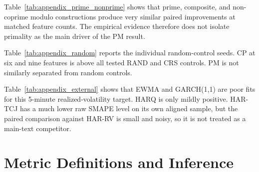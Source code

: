 \documentclass[a4paper]{article}
\begin{document}
\clearpage

{\renewcommand{\thetable}{C3}
\begin{center}
\label{tab:appendix_prime_nonprime}
\scriptsize
\renewcommand{\arraystretch}{1.08}
\resizebox{0.84\textwidth}{!}{}
\end{center}}

\noindent
Table~\ref{tab:appendix_prime_nonprime} shows that prime, composite, and non-coprime modulo constructions produce very similar paired improvements at matched feature counts. The empirical evidence therefore does not isolate primality as the main driver of the PM result.

\clearpage

{\renewcommand{\thetable}{C4}
\begin{center}
\label{tab:appendix_random}
\scriptsize
\renewcommand{\arraystretch}{1.08}
\resizebox{0.88\textwidth}{!}{}
\end{center}}

\noindent
Table~\ref{tab:appendix_random} reports the individual random-control seeds. CP at six and nine features is above all tested RAND and CRS controls. PM is not similarly separated from random controls.

{\renewcommand{\thetable}{C5}
\begin{center}
\label{tab:appendix_external}
\scriptsize
\renewcommand{\arraystretch}{1.08}
\resizebox{0.62\textwidth}{!}{}
\end{center}}

\noindent
Table~\ref{tab:appendix_external} shows that EWMA and GARCH(1,1) are poor fits for this 5-minute realized-volatility target. HARQ is only mildly positive. HAR-TCJ has a much lower raw SMAPE level on its own aligned sample, but the paired comparison against HAR-RV is small and noisy, so it is not treated as a main-text competitor.

\clearpage

\section{Metric Definitions and Inference}
\end{document}
